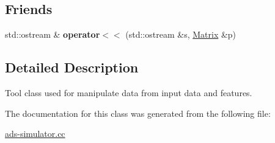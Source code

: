 \subsection*{Friends}
\begin{DoxyCompactItemize}
\item 
\hypertarget{classMatrix_a5ac1143f9f2df2f556d21e1f16891b52}{}std\+::ostream \& {\bfseries operator$<$$<$} (std\+::ostream \&s, \hyperlink{classMatrix}{Matrix} \&p)\label{classMatrix_a5ac1143f9f2df2f556d21e1f16891b52}

\end{DoxyCompactItemize}


\subsection{Detailed Description}
Tool class used for manipulate data from input data and features. 

The documentation for this class was generated from the following file\+:\begin{DoxyCompactItemize}
\item 
\hyperlink{ads-simulator_8cc}{ads-\/simulator.\+cc}\end{DoxyCompactItemize}
